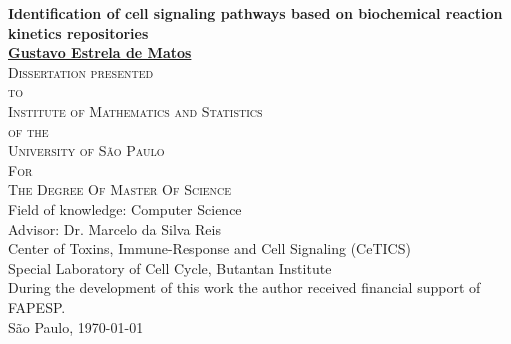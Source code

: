\documentclass[12pt, twoside]{report}
\numberwithin{mydefinition}{section}
\numberwithin{mytheorem}{section}
\numberwithin{mylemma}{section}
\numberwithin{corollary}{section}
\begin{document}
\thispagestyle{empty}
\begin{center}
{\Large
{\bf Identification of cell signaling pathways based on biochemical 
    reaction kinetics repositories}\\
\bigskip
\bigskip
\bigskip
\bigskip
    {\bf \href{mailto:gustavo.estrela.matos@gmail.com}{Gustavo Estrela de Matos}}\\
\bigskip
\bigskip
\bigskip
\bigskip
\textsc{
    Dissertation presented\\[-0.25cm] 
    to\\[-0.25cm]
    Institute of Mathematics and Statistics\\[-0.25cm]
    of the\\[-0.25cm]
    University of São Paulo\\[-0.25cm]
    For\\[-0.25cm]
    The Degree Of Master Of Science\\
    }
\bigskip
\bigskip
\bigskip
\bigskip
Field of knowledge: Computer Science\\
\bigskip
Advisor: Dr. Marcelo da Silva Reis\\
\bigskip
\bigskip
\bigskip
\bigskip
\bigskip
\bigskip
\bigskip
\bigskip
Center of Toxins, Immune-Response and Cell Signaling (CeTICS)\\
\bigskip
Special Laboratory of Cell Cycle, Butantan Institute\\
\bigskip
\bigskip
{\normalsize During the development of this work the author received 
    financial support of FAPESP.}\\
\bigskip
\bigskip
\bigskip
São Paulo, \today
}
\end{center}
\newpage
\end{document}
